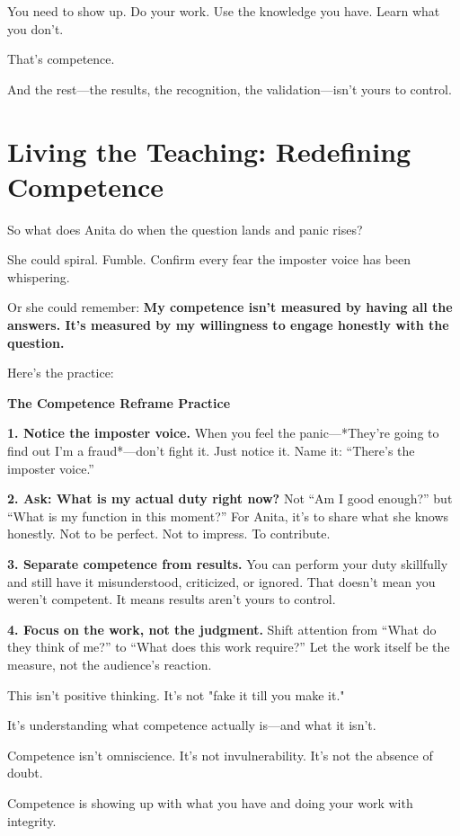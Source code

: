 \documentclass[11pt,twoside]{book}
\begin{document}
You need to show up. Do your work. Use the knowledge you have. Learn what you don't.

That's competence.

And the rest—the results, the recognition, the validation—isn't yours to control.

\section*{Living the Teaching: Redefining Competence}

So what does Anita do when the question lands and panic rises?

She could spiral. Fumble. Confirm every fear the imposter voice has been whispering.

Or she could remember: \textbf{My competence isn't measured by having all the answers. It's measured by my willingness to engage honestly with the question.}

Here's the practice:

\begin{practicebox}
\textbf{The Competence Reframe Practice}

\textbf{1. Notice the imposter voice.}
When you feel the panic—*They're going to find out I'm a fraud*—don't fight it. Just notice it. Name it: ``There's the imposter voice.''

\textbf{2. Ask: What is my actual duty right now?}
Not ``Am I good enough?'' but ``What is my function in this moment?'' For Anita, it's to share what she knows honestly. Not to be perfect. Not to impress. To contribute.

\textbf{3. Separate competence from results.}
You can perform your duty skillfully and still have it misunderstood, criticized, or ignored. That doesn't mean you weren't competent. It means results aren't yours to control.

\textbf{4. Focus on the work, not the judgment.}
Shift attention from ``What do they think of me?'' to ``What does this work require?'' Let the work itself be the measure, not the audience's reaction.
\end{practicebox}

This isn't positive thinking. It's not "fake it till you make it."

It's understanding what competence actually is—and what it isn't.

Competence isn't omniscience. It's not invulnerability. It's not the absence of doubt.

Competence is showing up with what you have and doing your work with integrity.
\end{document}
